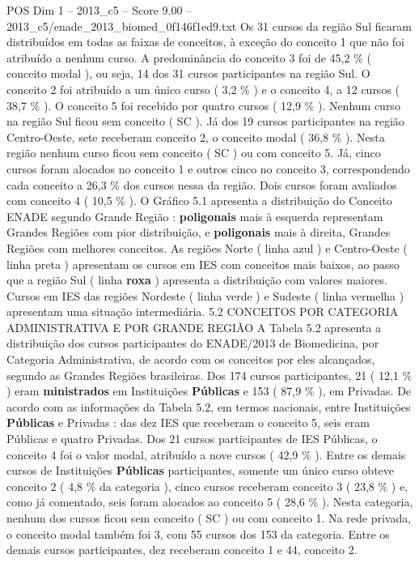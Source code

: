 \begin{textsample}{POS Dim 1 – 2013\_c5 – Score 9.00 – 2013\_c5/enade\_2013\_biomed\_0f146f1ed9.txt}
Os 31 cursos da região Sul ficaram distribuídos em todas as faixas de conceitos, à exceção do conceito 1 que não foi atribuído a nenhum curso.
A predominância do conceito 3 foi de 45,2 \% ( conceito modal ), ou seja, 14 dos 31 cursos participantes na região Sul.
O conceito 2 foi atribuído a um único curso ( 3,2 \% ) e o conceito 4, a 12 cursos ( 38,7 \% ).
O conceito 5 foi recebido por quatro cursos ( 12,9 \% ).
Nenhum curso na região Sul ficou sem conceito ( SC ).
Já dos 19 cursos participantes na região Centro-Oeste, sete receberam conceito 2, o conceito modal ( 36,8 \% ).
Nesta região nenhum curso ficou sem conceito ( SC ) ou com conceito 5.
Já, cinco cursos foram alocados no conceito 1 e outros cinco no conceito 3, correspondendo cada conceito a 26,3 \% dos cursos nessa da região.
Dois cursos foram avaliados com conceito 4 ( 10,5 \% ).
O Gráfico 5.1 apresenta a distribuição do Conceito ENADE segundo Grande Região : \textbf{poligonais} mais à esquerda representam Grandes Regiões com pior distribuição, e \textbf{poligonais} mais à direita, Grandes Regiões com melhores conceitos.
As regiões Norte ( linha azul ) e Centro-Oeste ( linha preta ) apresentam os cursos em IES com conceitos mais baixos, ao passo que a região Sul ( linha \textbf{roxa} ) apresenta a distribuição com valores maiores.
Cursos em IES das regiões Nordeste ( linha verde ) e Sudeste ( linha vermelha ) apresentam uma situação intermediária. 5.2 CONCEITOS POR CATEGORIA ADMINISTRATIVA E POR GRANDE REGIÃO A Tabela 5.2 apresenta a distribuição dos cursos participantes do ENADE/2013 de Biomedicina, por Categoria Administrativa, de acordo com os conceitos por eles alcançados, segundo as Grandes Regiões brasileiras.
Dos 174 cursos participantes, 21 ( 12,1 \% ) eram \textbf{ministrados} em Instituições \textbf{Públicas} e 153 ( 87,9 \% ), em Privadas.
De acordo com as informações da Tabela 5.2, em termos nacionais, entre Instituições \textbf{Públicas} e Privadas : das dez IES que receberam o conceito 5, seis eram Públicas e quatro Privadas.
Dos 21 cursos participantes de IES Públicas, o conceito 4 foi o valor modal, atribuído a nove cursos ( 42,9 \% ).
Entre os demais cursos de Instituições \textbf{Públicas} participantes, somente um único curso obteve conceito 2 ( 4,8 \% da categoria ), cinco cursos receberam conceito 3 ( 23,8 \% ) e, como já comentado, seis foram alocados ao conceito 5 ( 28,6 \% ).
Nesta categoria, nenhum dos cursos ficou sem conceito ( SC ) ou com conceito 1.
Na rede privada, o conceito modal também foi 3, com 55 cursos dos 153 da categoria.
Entre os demais cursos participantes, dez receberam conceito 1 e 44, conceito 2.

\end{textsample}
